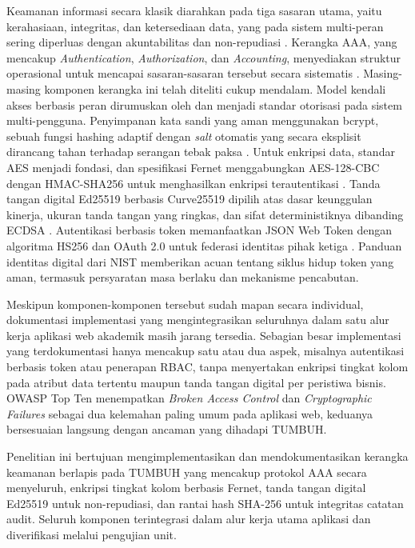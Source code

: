 \documentclass[12pt,a4paper]{article}
\begin{document}
Keamanan informasi secara klasik diarahkan pada tiga sasaran utama,
yaitu kerahasiaan, integritas, dan ketersediaan data, yang pada sistem
multi-peran sering diperluas dengan akuntabilitas dan non-repudiasi
\citep{Stallings2017, Anderson2020}. Kerangka AAA, yang mencakup
\textit{Authentication}, \textit{Authorization}, dan
\textit{Accounting}, menyediakan struktur operasional untuk mencapai
sasaran-sasaran tersebut secara sistematis \citep{RFC2904}. Masing-masing
komponen kerangka ini telah diteliti cukup mendalam. Model kendali
akses berbasis peran dirumuskan oleh \citet{Sandhu1996} dan menjadi
standar otorisasi pada sistem multi-pengguna. Penyimpanan kata sandi
yang aman menggunakan bcrypt, sebuah fungsi hashing adaptif dengan
\textit{salt} otomatis yang secara eksplisit dirancang tahan terhadap
serangan tebak paksa \citep{Provos1999}. Untuk enkripsi data, standar
AES \citep{NIST2001} menjadi fondasi, dan spesifikasi Fernet
menggabungkan AES-128-CBC dengan HMAC-SHA256 untuk menghasilkan
enkripsi terautentikasi \citep{Katz2014, Cryptography2024}. Tanda
tangan digital Ed25519 berbasis Curve25519 dipilih atas dasar
keunggulan kinerja, ukuran tanda tangan yang ringkas, dan sifat
deterministiknya dibanding ECDSA \citep{Bernstein2012, RFC8032}.
Autentikasi berbasis token memanfaatkan JSON Web Token dengan algoritma
HS256 \citep{RFC7519} dan OAuth 2.0 untuk federasi identitas pihak
ketiga \citep{RFC6749}. Panduan identitas digital dari NIST
\citeyearpar{NISTSP80063B} memberikan acuan tentang siklus hidup token
yang aman, termasuk persyaratan masa berlaku dan mekanisme pencabutan.

Meskipun komponen-komponen tersebut sudah mapan secara individual,
dokumentasi implementasi yang mengintegrasikan seluruhnya dalam satu
alur kerja aplikasi web akademik masih jarang tersedia. Sebagian besar
implementasi yang terdokumentasi hanya mencakup satu atau dua aspek,
misalnya autentikasi berbasis token atau penerapan RBAC, tanpa
menyertakan enkripsi tingkat kolom pada atribut data tertentu maupun
tanda tangan digital per peristiwa bisnis. OWASP Top Ten
\citep{OWASP2021} menempatkan \textit{Broken Access Control} dan
\textit{Cryptographic Failures} sebagai dua kelemahan paling umum pada
aplikasi web, keduanya bersesuaian langsung dengan ancaman yang
dihadapi TUMBUH.

Penelitian ini bertujuan mengimplementasikan dan mendokumentasikan
kerangka keamanan berlapis pada TUMBUH yang mencakup protokol AAA
secara menyeluruh, enkripsi tingkat kolom berbasis Fernet, tanda tangan
digital Ed25519 untuk non-repudiasi, dan rantai hash SHA-256 untuk
integritas catatan audit. Seluruh komponen terintegrasi dalam alur
kerja utama aplikasi dan diverifikasi melalui pengujian unit.
\end{document}
